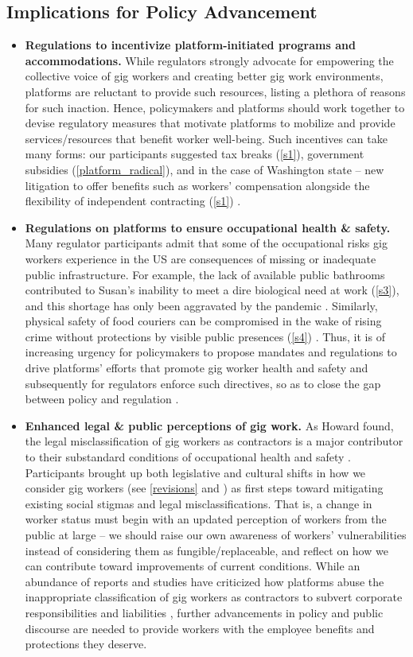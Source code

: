 \subsection{Implications for Policy Advancement}
\begin{itemize}
    \item \textbf{Regulations to incentivize platform-initiated programs and accommodations.} While regulators strongly advocate for empowering the collective voice of gig workers and creating better gig work environments, platforms are reluctant to provide such resources, listing a plethora of reasons for such inaction.  Hence, policymakers and platforms should work together to devise regulatory measures that motivate platforms to mobilize and provide services/resources that benefit worker well-being. Such incentives can take many forms: our participants suggested tax breaks (\ref{s1}), government subsidies (\ref{platform_radical}), and in the case of Washington state -- new litigation to offer benefits such as workers' compensation alongside the flexibility of independent contracting (\ref{s1}) \cite{noauthor_2022-wo}. 
    \item \textbf{Regulations on platforms to ensure  occupational health \& safety.} Many regulator participants admit that some of the occupational risks gig workers experience in the US are consequences of missing or inadequate public infrastructure. For example, the lack of available public bathrooms contributed to Susan's inability to meet a dire biological need at work (\ref{s3}), and this shortage has only been aggravated by the pandemic \cite{bathroom}. Similarly, physical safety of food couriers can be compromised in the wake of rising crime without protections by visible public presences (\ref{s4}) \cite{assault}. Thus, it is of increasing urgency for policymakers to propose mandates and regulations to drive platforms' efforts that promote gig worker health and safety and subsequently for regulators enforce such directives, so as to close the gap between policy and regulation \cite{fan2022online}.
    \item \textbf{Enhanced legal \& public perceptions of gig work.} As Howard found, the legal misclassification of gig workers as contractors is a major contributor to their substandard conditions of occupational health and safety \cite{Howard2017-wd}. Participants brought up both legislative and cultural shifts in how we consider gig workers (see \ref{revisions}  and ) as first steps toward mitigating existing social stigmas and legal misclassifications. That is, a change in worker status must begin with an updated perception of workers from the public at large -- we should raise our own awareness of workers' vulnerabilities instead of considering them as fungible/replaceable, and reflect on how we can contribute toward improvements of current conditions. While an abundance of reports and studies have criticized how platforms abuse the inappropriate classification of gig workers as contractors to subvert corporate responsibilities and liabilities \cite{lobel2017gig, Gray2019-ue, Dubal2017-bj, jit, tran2017gig, delfino2018work}, further advancements in policy and public discourse are needed to provide workers with the employee benefits and protections they deserve.

\end{itemize}
